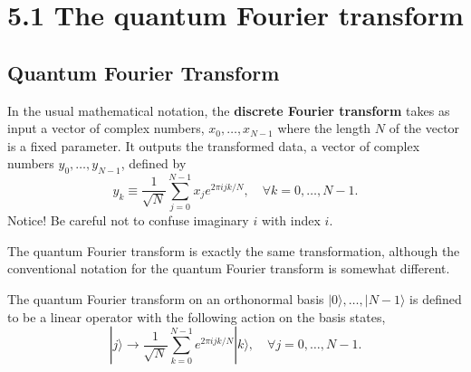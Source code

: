 
\section*{5.1 The quantum Fourier transform}



\subsection{Quantum Fourier Transform}

In the usual mathematical notation, the \textbf{discrete Fourier transform} takes as input a vector of complex numbers, $x_{0}, \ldots, x_{N-1}$ where the length $N$ of the vector is a fixed parameter. It outputs the transformed data, a vector of complex numbers $y_{0}, \ldots, y_{N-1}$, defined by
\begin{equation*}
y_{k} \equiv \frac{1}{\sqrt{N}} \sum_{j=0}^{N-1} x_{j} e^{2 \pi i j k / N}, \quad \forall k = 0,\dots,N-1.
\tag{5.1}
\end{equation*}
Notice! Be careful not to confuse imaginary $i$ with index $i$.

The quantum Fourier transform is exactly the same transformation, although the conventional notation for the quantum Fourier transform is somewhat different. 

\begin{definition}
    The quantum Fourier transform on an orthonormal basis $|0\rangle, \ldots,|N-1\rangle$ is defined to be a linear operator with the following action on the basis states,
\begin{equation*}
|j\rangle \longrightarrow \frac{1}{\sqrt{N}} \sum_{k=0}^{N-1} e^{2 \pi i j k / N}|k\rangle, \quad \forall j = 0,\dots,N-1. \tag{5.2}
\end{equation*}
\end{definition}

